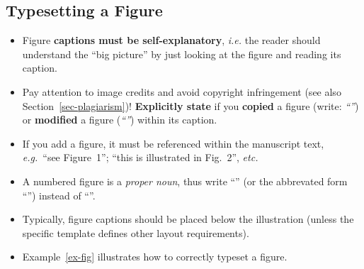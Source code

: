\documentclass[11pt,a4paper]{article}
\begin{document}
\subsection{Typesetting a Figure}
\noindent

\begin{itemize}
 \item Figure \textbf{captions must be self-explanatory}, \emph{i.e.} the reader should understand the ``big picture'' by just looking at the figure and reading its caption.
 
 \item Pay attention to image credits and avoid copyright infringement (see also Section~\ref{sec-plagiarism})! \textbf{Explicitly state} if you \textbf{copied} a figure (write: \emph{``''}) or \textbf{modified} a figure (\emph{``''}) within its caption.
 
 \item If you add a figure, it must be referenced within the manuscript text, \emph{e.g.}~``see Figure~1''; ``this is illustrated in Fig.~2'', \emph{etc.}
 
 \item A numbered figure is a \emph{proper noun}, thus write ``'' (or the abbrevated form ``'') instead of ``''.
 
 \item Typically, figure captions should be placed below the illustration (unless the specific template defines other layout requirements).
 
 \item Example~\ref{ex-fig} illustrates how to correctly typeset a figure.
\end{itemize}
\end{document}
